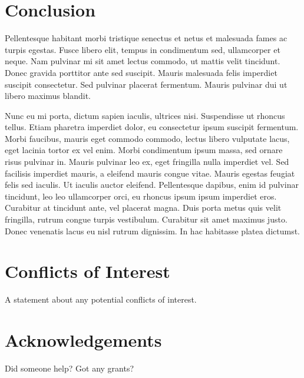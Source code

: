 \documentclass[OGEO,XML,SOM,NoBabelFrench,Unicode,twocolumn,review]{cedram}
\begin{document}
    \section{Conclusion}

        Pellentesque habitant morbi tristique senectus et netus et malesuada fames ac turpis egestas. Fusce libero elit, tempus in condimentum sed, ullamcorper et neque. Nam pulvinar mi sit amet lectus commodo, ut mattis velit tincidunt. Donec gravida porttitor ante sed suscipit. Mauris malesuada felis imperdiet suscipit consectetur. Sed pulvinar placerat fermentum. Mauris pulvinar dui ut libero maximus blandit.
        
        Nunc eu mi porta, dictum sapien iaculis, ultrices nisi. Suspendisse ut rhoncus tellus. Etiam pharetra imperdiet dolor, eu consectetur ipsum suscipit fermentum. Morbi faucibus, mauris eget commodo commodo, lectus libero vulputate lacus, eget lacinia tortor ex vel enim. Morbi condimentum ipsum massa, sed ornare risus pulvinar in. Mauris pulvinar leo ex, eget fringilla nulla imperdiet vel. Sed facilisis imperdiet mauris, a eleifend mauris congue vitae. Mauris egestas feugiat felis sed iaculis. Ut iaculis auctor eleifend. Pellentesque dapibus, enim id pulvinar tincidunt, leo leo ullamcorper orci, eu rhoncus ipsum ipsum imperdiet eros. Curabitur at tincidunt ante, vel placerat magna. Duis porta metus quis velit fringilla, rutrum congue turpis vestibulum. Curabitur sit amet maximus justo. Donec venenatis lacus eu nisl rutrum dignissim. In hac habitasse platea dictumst.

    \section*{Conflicts of Interest} %
        A statement about any potential conflicts of interest.

    \section*{Acknowledgements}
        Did someone help? Got any grants?

    

    
\end{document}
